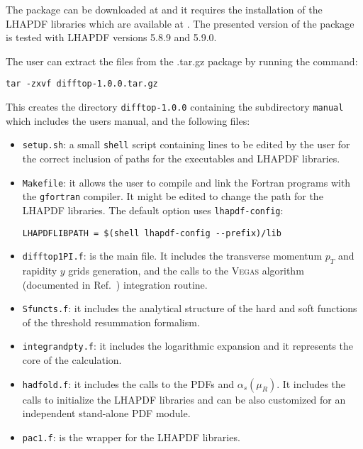 \documentclass[11pt]{article}
\begin{document}
{The package can be downloaded at \cite{difftop_web} and it requires the installation of the 
LHAPDF libraries which are available at \cite{lhapdf_web}.
The presented version of the package is tested with LHAPDF versions 5.8.9 and 5.9.0.

The user can extract the files from the .tar.gz package by running the command:
\begin{verbatim}
tar -zxvf difftop-1.0.0.tar.gz
\end{verbatim}
This creates the directory \texttt{difftop-1.0.0} containing the subdirectory \texttt{manual} which includes the 
users manual, and the following files:

\begin{itemize}

\item \texttt{setup.sh}: a small \texttt{shell} script containing lines to be edited by 
the user for the correct inclusion of paths for the executables and LHAPDF libraries.

\item \texttt{Makefile}: it allows the user to compile and link the Fortran programs with the \texttt{gfortran} compiler. 
It might be edited to change the path for the LHAPDF libraries. The default option uses \texttt{lhapdf-config}:
\begin{verbatim}
LHAPDFLIBPATH = $(shell lhapdf-config --prefix)/lib
\end{verbatim}

\item \texttt{difftop1PI.f}: is the main file. It includes the transverse momentum $p_T$ and rapidity $y$ grids generation, 
and the calls to the \textsc{Vegas} algorithm (documented in Ref.~\cite{Lepage:1977sw}) integration routine. 

\item \texttt{Sfuncts.f}: it includes the analytical structure of the hard and soft functions of the threshold resummation formalism.

\item \texttt{integrandpty.f}: it includes the logarithmic expansion and it represents the core of the calculation.

\item \texttt{hadfold.f}: it includes the calls to the PDFs and $\alpha_s(\mu_R)$. 
It includes the calls to initialize 
the LHAPDF libraries and can be also customized for an independent stand-alone PDF module.

\item \texttt{pac1.f}: is the wrapper for the LHAPDF libraries.


\end{itemize}}
\end{document}

